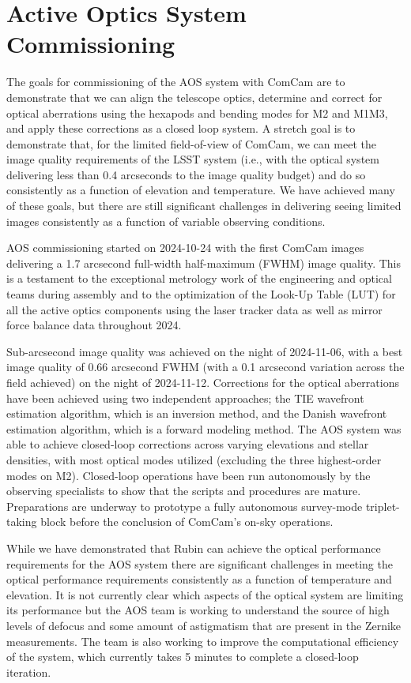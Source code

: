 \section{Active Optics System Commissioning}
\label{sec:aos_commissioning}

The goals for commissioning of the AOS system with ComCam are to demonstrate that we can align the telescope optics, determine and correct for optical aberrations using the hexapods and bending modes for M2 and M1M3, and apply these corrections as a closed loop system. A stretch goal is to demonstrate that, for the limited field-of-view of ComCam, we can meet the image quality requirements of the LSST system (i.e., with the optical system delivering less than 0.4 arcseconds to the image quality budget) and do so consistently as a function of elevation and temperature. We have achieved many of these goals, but there are still significant challenges in delivering seeing limited images consistently as a function of variable observing conditions.

AOS commissioning started on 2024-10-24 with the first ComCam images delivering a 1.7 arcsecond full-width half-maximum (FWHM) image quality. This is a testament to the exceptional metrology work of the engineering and optical teams during assembly and to the optimization of the Look-Up Table (LUT) for all the active optics components using the  laser tracker data as well as mirror force balance data throughout 2024. 

Sub-arcsecond image quality was achieved on the night of 2024-11-06, with a best image quality of 0.66 arcsecond FWHM (with a 0.1 arcsecond variation across the field achieved) on the night of  2024-11-12. Corrections for the optical aberrations have been achieved using two independent approaches; the TIE wavefront estimation algorithm, which is an inversion method, and the Danish wavefront estimation algorithm, which is a forward modeling method. The AOS system was able to achieve closed-loop corrections across varying elevations and stellar densities, with most optical modes utilized (excluding the three highest-order modes on M2). Closed-loop operations have been run autonomously by the observing specialists to show that the scripts and procedures are mature. Preparations are underway to prototype a fully autonomous survey-mode triplet-taking block before the conclusion of ComCam's on-sky operations.

While we have demonstrated that Rubin can achieve the optical performance requirements for the AOS system there are significant challenges in meeting the optical performance requirements consistently as a function of temperature and elevation. It is not currently clear which aspects of the optical system are limiting its performance but the AOS team is working to understand the source of high levels of defocus and some amount of astigmatism that are present in the Zernike measurements. The team is also working to improve the computational efficiency of the system, which currently takes 5 minutes to complete a closed-loop iteration. 

